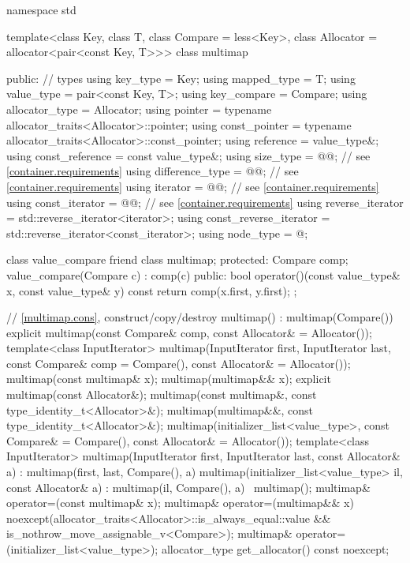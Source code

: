%
%
\begin{codeblock}
namespace std {
  template<class Key, class T, class Compare = less<Key>,
           class Allocator = allocator<pair<const Key, T>>>
  class multimap {
  public:
    // types
    using key_type               = Key;
    using mapped_type            = T;
    using value_type             = pair<const Key, T>;
    using key_compare            = Compare;
    using allocator_type         = Allocator;
    using pointer                = typename allocator_traits<Allocator>::pointer;
    using const_pointer          = typename allocator_traits<Allocator>::const_pointer;
    using reference              = value_type&;
    using const_reference        = const value_type&;
    using size_type              = @@; // see \ref{container.requirements}
    using difference_type        = @@; // see \ref{container.requirements}
    using iterator               = @@; // see \ref{container.requirements}
    using const_iterator         = @@; // see \ref{container.requirements}
    using reverse_iterator       = std::reverse_iterator<iterator>;
    using const_reverse_iterator = std::reverse_iterator<const_iterator>;
    using node_type              = @\unspec@;

    class value_compare {
      friend class multimap;
    protected:
      Compare comp;
      value_compare(Compare c) : comp(c) { }
    public:
      bool operator()(const value_type& x, const value_type& y) const {
        return comp(x.first, y.first);
      }
    };

    // \ref{multimap.cons}, construct/copy/destroy
    multimap() : multimap(Compare()) { }
    explicit multimap(const Compare& comp, const Allocator& = Allocator());
    template<class InputIterator>
      multimap(InputIterator first, InputIterator last,
               const Compare& comp = Compare(),
               const Allocator& = Allocator());
    multimap(const multimap& x);
    multimap(multimap&& x);
    explicit multimap(const Allocator&);
    multimap(const multimap&, const type_identity_t<Allocator>&);
    multimap(multimap&&, const type_identity_t<Allocator>&);
    multimap(initializer_list<value_type>,
      const Compare& = Compare(),
      const Allocator& = Allocator());
    template<class InputIterator>
      multimap(InputIterator first, InputIterator last, const Allocator& a)
        : multimap(first, last, Compare(), a) { }
    multimap(initializer_list<value_type> il, const Allocator& a)
      : multimap(il, Compare(), a) { }
    ~multimap();
    multimap& operator=(const multimap& x);
    multimap& operator=(multimap&& x)
      noexcept(allocator_traits<Allocator>::is_always_equal::value &&
               is_nothrow_move_assignable_v<Compare>);
    multimap& operator=(initializer_list<value_type>);
    allocator_type get_allocator() const noexcept;

}}
\end{codeblock}
